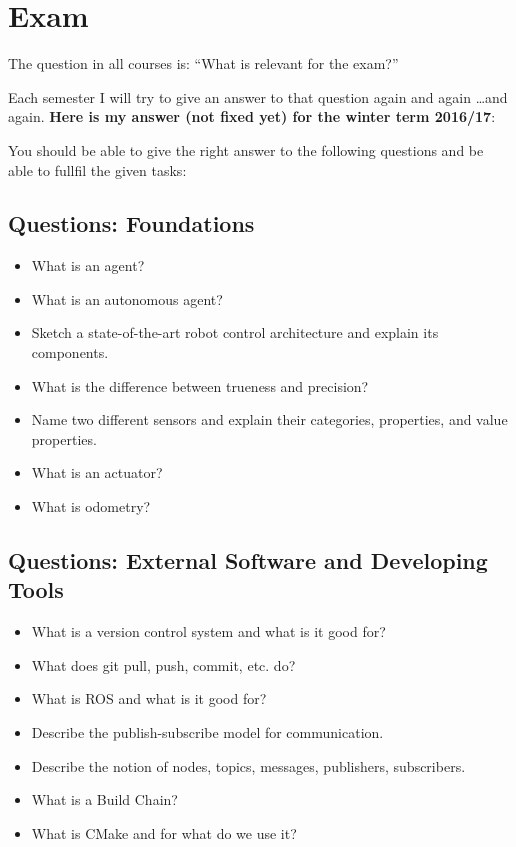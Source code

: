 \chapter{Exam}
\label{chap:Exam}

The question in all courses is: ``What is relevant for the exam?''

Each semester I will try to give an answer to that question again and again \ldots and again. \textbf{Here is my answer (not fixed yet) for the winter term 2016/17}:

You should be able to give the right answer to the following questions and be able to fullfil the given tasks:

\section{Questions: Foundations}
\label{sec:questions_foundations}

\begin{itemize}
 \item What is an agent?
 \item What is an autonomous agent?
 \item Sketch a state-of-the-art robot control architecture and explain its components.
 \item What is the difference between trueness and precision?
 \item Name two different sensors and explain their categories, properties, and value properties.
 \item What is an actuator?
 \item What is odometry?
\end{itemize}

\section{Questions: External Software and Developing Tools}
\label{sec:questions_tools}

\begin{itemize}
 \item What is a version control system and what is it good for?
 \item What does git pull, push, commit, etc. do?
 \item What is ROS and what is it good for?
 \item Describe the publish-subscribe model for communication.
 \item Describe the notion of nodes, topics, messages, publishers, subscribers.
 \item What is a Build Chain?
 \item What is CMake and for what do we use it?
\end{itemize}

